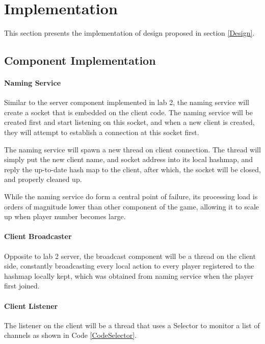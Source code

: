 \section{Implementation}\label{Impl}

This section presents the implementation of design proposed in section \ref{Design}.

\subsection*{Component Implementation}\label{ImplComponent}

\paragraph*{Naming Service}

Similar to the server component implemented in lab 2, the naming service will create a socket that is embedded on the client code. The naming service will be created first and start listening on this socket, and when a new client is created, they will attempt to establish a connection at this socket first.

The naming service will spawn a new thread on client connection. The thread will simply put the new client name, and socket address into its local hashmap, and reply the up-to-date hash map to the client, after which, the socket will be closed, and properly cleaned up.

While the naming service do form a central point of failure, its processing load is orders of magnitude lower than other component of the game, allowing it to scale up when player number becomes large.

\paragraph*{Client Broadcaster}

Opposite to lab 2 server, the broadcast component will be a thread on the client side, constantly broadcasting every local action to every player registered to the hashmap locally kept, which was obtained from naming service when the player first joined.

\paragraph*{Client Listener}

The listener on the client will be a thread that uses a Selector to monitor a list of channels as shown in Code \ref{CodeSelector}. 

